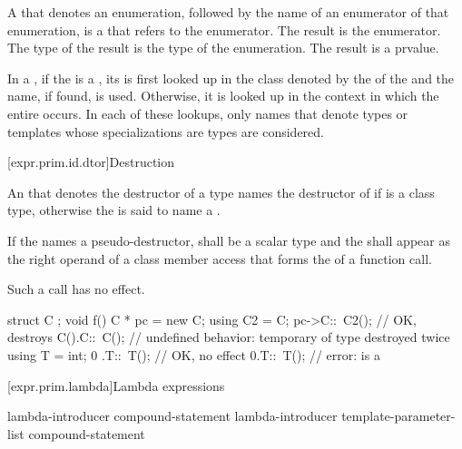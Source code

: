 \pnum
A  that denotes an
enumeration, followed by the name of an
enumerator of that enumeration, is a 
that refers to the enumerator. The result is the enumerator. The type
of the result is the type of the enumeration. The result is a prvalue.

\pnum
In a , if the
is a
, its 
is first looked up in the class denoted by
the  of the  and
the name, if found, is used.
Otherwise, it is looked up in the context in which
the entire  occurs.
In each of these lookups, only names that denote types or
templates whose specializations are types are considered.

[expr.prim.id.dtor]{Destruction}

\pnum
{}%
%
An  that denotes the destructor of a type 
names the destructor of 
if  is a class type,
otherwise the  is said
to name a .

\pnum
If the  names a pseudo-destructor,
 shall be a scalar type and
the  shall appear
as the right operand of a class member access that forms
the  of a function call.
\begin{note}
Such a call has no effect.
\end{note}

\pnum
\begin{example}
\begin{codeblock}
struct C { };
void f() {
  C * pc = new C;
  using C2 = C;
  pc->C::~C2();     // OK, destroys 
  C().C::~C();      // undefined behavior: temporary of type  destroyed twice
  using T = int;
  0 .T::~T();       // OK, no effect
  0.T::~T();        // error:  is a 
}
\end{codeblock}
\end{example}

[expr.prim.lambda]{Lambda expressions}%

\begin{bnf}
\br
    lambda-introducer  compound-statement\br
    lambda-introducer \terminal{<} template-parameter-list \terminal{>}   compound-statement
\end{bnf}

